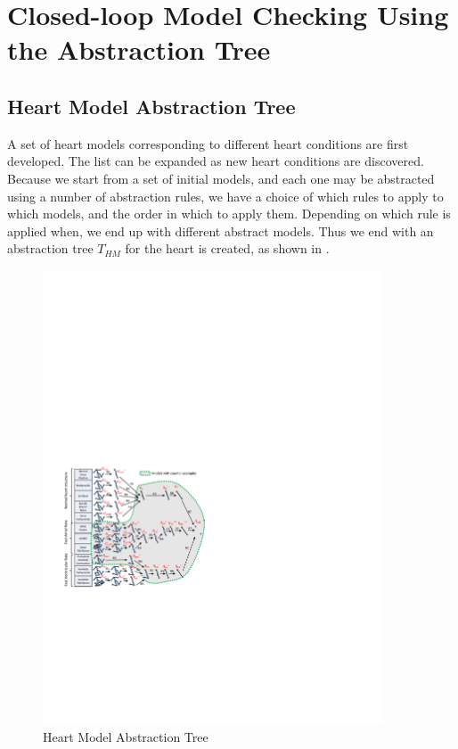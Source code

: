 \section{Closed-loop Model Checking Using the Abstraction Tree}
\subsection{Heart Model Abstraction Tree}
A set of heart models corresponding to different heart conditions are first developed. 
The list can be expanded as new heart conditions are discovered.
Because we start from a set of initial models, and each one may be abstracted using a number of abstraction rules, we have a choice of which rules to apply to which models, and the order in which to apply them.
Depending on which rule is applied when, we end up with different abstract models.
Thus we end with an abstraction tree $T_{HM}$ for the heart is created, as shown in . 
\begin{figure}[!t]
	\centering
	\includegraphics[width=0.9\textwidth]{figs/abs.pdf}
	\caption{\small Heart Model Abstraction Tree}
	\vspace{-15pt}
	\label{fig:HM_abs}
\end{figure}
